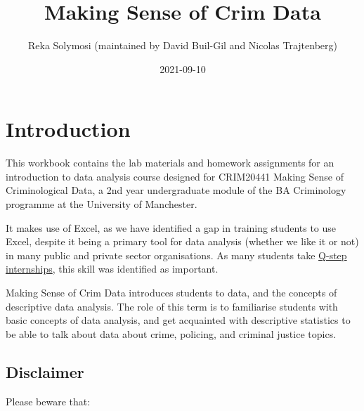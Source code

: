 \documentclass[
]{book}
\title{Making Sense of Crim Data}
\author{Reka Solymosi (maintained by David Buil-Gil and Nicolas Trajtenberg)}
\date{2021-09-10}
\begin{document}
\maketitle

{
\setcounter{tocdepth}{1}
\tableofcontents
}
\hypertarget{introduction}{%
\chapter*{Introduction}\label{introduction}}

This workbook contains the lab materials and homework assignments for an introduction to data analysis course designed for CRIM20441 Making Sense of Criminological Data, a 2nd year undergraduate module of the BA Criminology programme at the University of Manchester.

It makes use of Excel, as we have identified a gap in training students to use Excel, despite it being a primary tool for data analysis (whether we like it or not) in many public and private sector organisations. As many students take \href{https://www.humanities.manchester.ac.uk/q-step/}{Q-step internships}, this skill was identified as important.

Making Sense of Crim Data introduces students to data, and the concepts of descriptive data analysis. The role of this term is to familiarise students with basic concepts of data analysis, and get acquainted with descriptive statistics to be able to talk about data about crime, policing, and criminal justice topics.

\hypertarget{disclaimer}{%
\section*{Disclaimer}\label{disclaimer}}

Please beware that:
\end{document}
